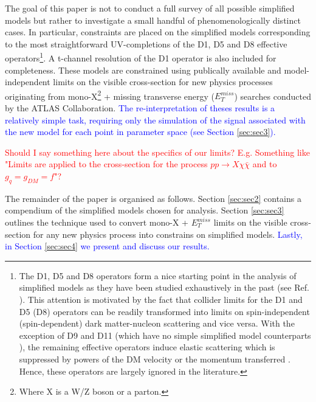 \begin{flushleft}
\hspace{1cm} The goal of this paper is not to conduct a full survey of all possible simplified models but rather to investigate a small handful of phenomenologically distinct cases. In particular, constraints are placed on the simplified models corresponding to the most straightforward UV-completions of the D1, D5 and D8 effective operators\footnote{The D1, D5 and D8 operators form a nice starting point in the analysis of simplified models as they have been studied exhaustively in the past (see Ref. \cite{}). This attention is motivated by the fact that collider limits for the D1 and D5 (D8) operators can be readily transformed into limits on spin-independent (spin-dependent) dark matter-nucleon scattering and vice versa. With the exception of D9 and D11 (which have no simple simplified model counterparts \cite{}), the remaining effective operators induce elastic scattering which is suppressed by powers of the DM velocity or the momentum transferred \cite{Kumar}. Hence, these operators are largely ignored in the literature.}. A t-channel resolution of the D1 operator is also included for completeness. These models are constrained using publically available and model-independent limits on the visible cross-section for new physics processes originating from mono-X\footnote{Where X is a W/Z boson or a parton.} + missing transverse energy ($E_{T}^{miss}$) searches conducted by the ATLAS Collaboration.  \textcolor{blue}{The re-interpretation of theses results is a relatively simple task, requiring only the simulation of the signal associated with the new model for each point in parameter space (see Section \ref{sec:sec3}).}

\hspace{1cm} \textcolor{red}{Should I say something here about the specifics of our limits? E.g. Something like "Limits are applied to the cross-section for the process $pp \rightarrow X\chi\bar{\chi}$ and to $g_{q} = g_{DM} = f$"?}

\hspace{1cm} The remainder of the paper is organised as follows. Section \ref{sec:sec2} contains a compendium of the simplified models chosen for analysis. Section \ref{sec:sec3} outlines the technique used to convert mono-X + $E_{T}^{miss}$ limits on the visible cross-section for any new physics process into constrains on simplified models. \textcolor{blue}{Lastly, in Section \ref{sec:sec4} we present and discuss our results.}
\bigskip


\end{flushleft}
